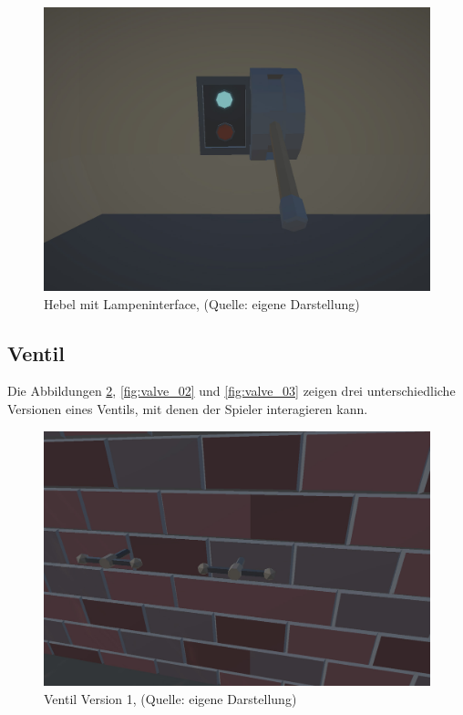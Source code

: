 \begin{figure}[ht]
\centering
\includegraphics[width=0.8\linewidth]{content/pictures/Lever_activator_diod.jpg}
\caption{Hebel mit Lampeninterface, (Quelle: eigene Darstellung)}
\label{fig:lever_interactable_active_diods}
\end{figure}

\subsection{Ventil}
Die Abbildungen \ref{fig:valve_01}, \ref{fig:valve_02} und \ref{fig:valve_03} zeigen drei unterschiedliche Versionen eines Ventils, mit denen der Spieler interagieren kann. 

\begin{figure}[ht]
\centering
\includegraphics[width=0.8\linewidth]{content/pictures/Vault.jpg}
\caption{Ventil Version 1, (Quelle: eigene Darstellung)}
\label{fig:valve_01}
\end{figure}

